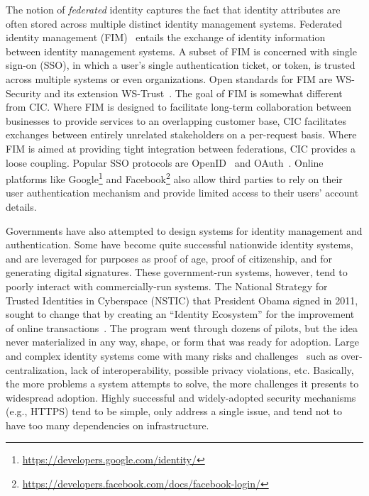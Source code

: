 \documentclass[conference]{IEEEtran}
\begin{document}
The notion of \emph{federated} identity captures the fact that identity attributes are often stored across multiple distinct identity management systems. Federated identity management (FIM)~\cite{chadwick2009federated} entails the exchange of identity information between identity management systems. A subset of FIM is concerned with single sign-on (SSO), in which a user's single authentication ticket, or token, is trusted across multiple systems or even organizations. Open standards for FIM are WS-Security and its extension WS-Trust~\cite{anderson2004web}. The goal of FIM is somewhat different from CIC. Where FIM is designed to facilitate long-term collaboration between businesses to provide services to an overlapping customer base, CIC facilitates exchanges between entirely unrelated stakeholders on a per-request basis. Where FIM is aimed at providing tight integration between federations, CIC provides a loose coupling. Popular SSO protocols are OpenID~\cite{recordon2006openid} and OAuth~\cite{hardt2012oauth}. Online platforms like Google\footnote{\url{https://developers.google.com/identity/}} and Facebook\footnote{\url{https://developers.facebook.com/docs/facebook-login/}} also allow third parties to rely on their user authentication mechanism and provide limited access to their users' account details.

Governments have also attempted to design systems for identity management and authentication. Some have become quite successful nationwide identity systems, and are leveraged for purposes as proof of age, proof of citizenship, and for generating digital signatures. These government-run systems, however, tend to poorly interact with commercially-run systems. The National Strategy for Trusted Identities in Cyberspace (NSTIC) that President Obama signed in 2011, sought to change that by creating an ``Identity Ecosystem'' for the improvement of online transactions~\cite{megas2015nstic}. The program went through dozens of pilots, but the idea never materialized in any way, shape, or form that was ready for adoption. Large and complex identity systems come with many risks and challenges~\cite{NAP10346} such as over-centralization, lack of interoperability, possible privacy violations, etc. Basically, the more problems a system attempts to solve, the more challenges it presents to widespread adoption. Highly successful and widely-adopted security mechanisms (e.g., HTTPS) tend to be simple, only address a single issue, and tend not to have too many dependencies on infrastructure.
\end{document}
